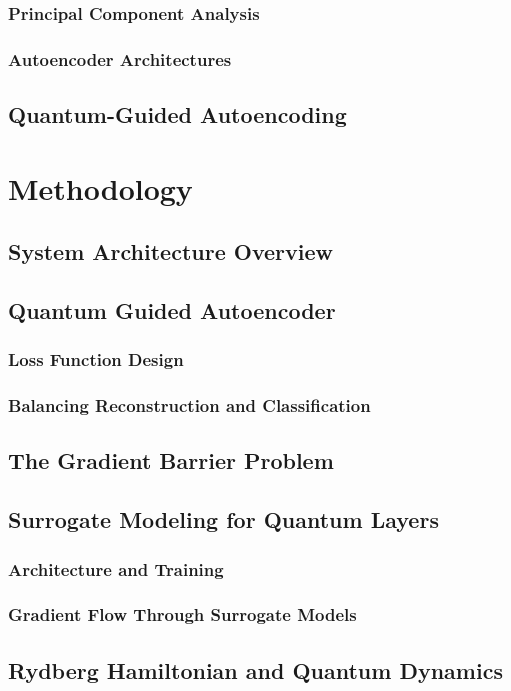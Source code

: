 \documentclass[conference]{IEEEtran}
\begin{document}
\subsubsection{Principal Component Analysis}
\subsubsection{Autoencoder Architectures}
\subsection{Quantum-Guided Autoencoding}

\section{Methodology}
\subsection{System Architecture Overview}
\subsection{Quantum Guided Autoencoder}
\subsubsection{Loss Function Design}
\subsubsection{Balancing Reconstruction and Classification}
\subsection{The Gradient Barrier Problem}
\subsection{Surrogate Modeling for Quantum Layers}
\subsubsection{Architecture and Training}
\subsubsection{Gradient Flow Through Surrogate Models}
\subsection{Rydberg Hamiltonian and Quantum Dynamics}
\end{document}

